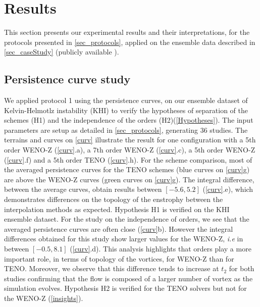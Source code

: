 

\section{Results}
\label{sec_experimentalResults}
This section presents our experimental results and their interpretations, for
the protocols presented in \autoref{sec_protocols}, applied on the ensemble data
described in \autoref{sec_caseStudy}
(publicly
available \cite{data}).


\subsection{Persistence curve study}



We applied protocol 1 using the persistence curves, on our ensemble dataset of Kelvin-Helmotlz instability (KHI) to verify the hypotheses of separation of the schemes (H1) and the independence of the orders (H2)(\autoref{Hypotheses}). 
The input parameters are setup as detailed in \autoref{sec_protocols}, generating 36 studies. The terrains and curves on
\autoref{curv} illustrate the result for one configuration with a 5th order WENO-Z (\autoref{curv}.a), a 7th order WENO-Z (\autoref{curv}.c), a 5th order WENO-Z (\autoref{curv}.f) and a 5th order TENO (\autoref{curv}.h). For the scheme comparison, most of the averaged persistence curves for the TENO schemes (blue curves on \autoref{curv}g) are above the WENO-Z curves (green curves on \autoref{curv}g).
The integral difference, between the average curves, obtain results between $[-5.6,5.2]$ (\autoref{curv}.e), which demonstrates differences on the topology of the enstrophy between the interpolation methods as expected.
Hypothesis H1 is verified on the KHI ensemble dataset. For the study on the 
independence of orders, we see that the averaged persistence curves are often 
close (\autoref{curv}b). However the integral differences obtained for this 
study show larger values for the WENO-Z, \emph{i.e} in between $[-0.5, 8.1]$ 
(\autoref{curv}.d). This analysis highlights that orders play a more important 
role, in terms of topology of the vortices, for WENO-Z than for TENO. Moreover, 
we observe that this difference tends to increase at $t_2$ for both studies 
confirming that the flow is composed of a larger number of vortex as the 
simulation evolves. Hypothesis H2 is verified for the TENO solvers but not for 
the WENO-Z
(\autoref{insights}).
 



